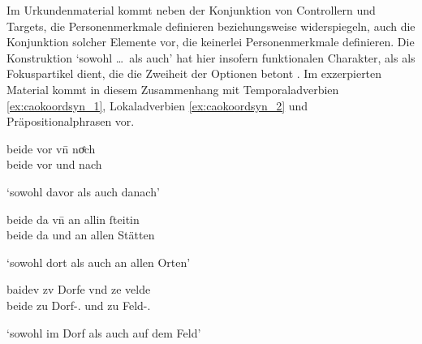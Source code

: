 Im Urkundenmaterial kommt neben der Konjunktion von Controllern und Targets,
die Personenmerkmale definieren beziehungsweise widerspiegeln, auch die
Konjunktion solcher Elemente vor, die keinerlei Personenmerkmale definieren.
Die Konstruktion  `sowohl \dots\ als auch' hat
hier insofern funktionalen Charakter, als  als Fokuspartikel dient,
die die Zweiheit der Optionen betont \autocites(siehe auch
\cref{sec:ovwbeideconj})[425--428]{johannessen2005}.
% 
% 
% 
Im exzerpierten Material kommt  in diesem Zusammenhang mit
Temporaladverbien \cref{ex:caokoordsyn_1}, Lokaladverbien
\cref{ex:caokoordsyn_2} und Präpositionalphrasen
 vor.

\begin{exe}
\ex \label{ex:caokoordsyn}
	\begin{xlist}
	\ex \label{ex:caokoordsyn_1}
		\gll beide vor vn̄ noͤch \\
			beide vor und nach \\
		\begin{taggedline}{\parencites(Straßburg, 1295)[\pno~N~689, 499.25]{cao5}}
		\trans `sowohl davor als auch danach'
		\end{taggedline}

	\ex \label{ex:caokoordsyn_2}
		\gll beide da vn̄ an allin ſteitin \\
			beide da und an allen Stätten \\
		\begin{taggedline}{\parencites(Rosheim, Dépt.~Bas-Rhin, 1286)[\pno~N~321, 245.24]{cao5}}
		\trans `sowohl dort als auch an allen  Orten'
		\end{taggedline}

	\ex \label{ex:caokoordsyn_3}
		\gll baidev zv Dorfe vnd ze velde \\
			beide zu Dorf-\Dat.\Sg{} und zu Feld-\Dat.\Sg{} \\
		\begin{taggedline}{\parencites(Michelstetten, Bz.~Mistelbach, 1299)[\pno~3319, 461.28]{cao4}}
		\trans `sowohl im Dorf als auch auf dem Feld'
		\end{taggedline}
	\end{xlist}
\end{exe}

